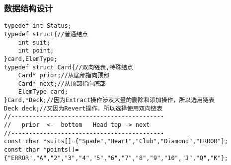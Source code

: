 \documentclass[a4paper,11pt]{article}%
\begin{document}
\subsubsection{数据结构设计}
\begin{lstlisting}[language={[ANSI]C},keywordstyle=\color{blue!70},commentstyle=\color{red!50!green!50!blue!50},frame=shadowbox,
    rulesepcolor=\color{red!20!green!20!blue!20}]
typedef int Status;
typedef struct{//普通结点
	int suit;
	int point;
}card,ElemType;
typedef struct Card{//双向链表,特殊结点
	Card* prior;//从底部指向顶部
	Card* next;//从顶部指向底部
	ElemType card;
}Card,*Deck;//因为Extract操作涉及大量的删除和添加操作，所以选用链表
Deck deck;//又因为Revert操作，所以选择使用双向链表
//-------------------------------------------
//   prior  <-  bottom   Head top -> next
//-------------------------------------------
const char *suits[]={"Spade","Heart","Club","Diamond","ERROR"};
const char *points[]={"ERROR","A","2","3","4","5","6","7","8","9","10","J","Q","K"};
\end{lstlisting}
\end{document}
